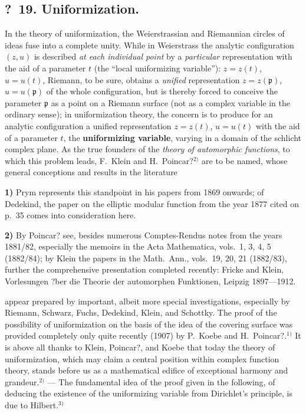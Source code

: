 \documentclass{article}
\begin{document}
\subsection*{?~19. Uniformization.}

In the theory of uniformization, the Weierstrassian and Riemannian circles of ideas fuse into a complete unity. While in Weierstrass the analytic configuration $(z, u)$ is described \emph{at each individual point} by a \emph{particular} representation with the aid of a parameter $t$ (the ``local uniformizing variable''): $z = z(t)$, $u = u(t)$, Riemann, to be sure, obtains a \emph{unified} representation $z = z(\mathfrak{p})$, $u = u(\mathfrak{p})$ of the whole configuration, but is thereby forced to conceive the parameter $\mathfrak{p}$ as a point on a Riemann surface (not as a complex variable in the ordinary sense); in uniformization theory, the concern is to produce for an analytic configuration a unified representation $z = z(t)$, $u = u(t)$ with the aid of a parameter $t$, the \textbf{uniformizing variable}, varying in a domain of the schlicht complex plane. As the true founders of the \emph{theory of automorphic functions}, to which this problem leads, F.~Klein and H.~Poincar?${}^{2)}$ are to be named, whose general conceptions and results in the literature

\textbf{1)} Prym represents this standpoint in his papers from 1869 onwards; of Dedekind, the paper on the elliptic modular function from the year 1877 cited on p.~35 comes into consideration here.

\textbf{2)} By Poincar? see, besides numerous Comptes-Rendus notes from the years 1881/82, especially the memoirs in the Acta Mathematica, vols.~1, 3, 4, 5 (1882/84); by Klein the papers in the Math.\ Ann., vols.~19, 20, 21 (1882/83), further the comprehensive presentation completed recently: Fricke and Klein, Vorlesungen ?ber die Theorie der automorphen Funktionen, Leipzig 1897---1912.

appear prepared by important, albeit more special investigations, especially by Riemann, Schwarz, Fuchs, Dedekind, Klein, and Schottky. The proof of the possibility of uniformization on the basis of the idea of the covering surface was provided completely only quite recently (1907) by P.~Koebe and H.~Poincar?.${}^{1)}$ It is above all thanks to Klein, Poincar?, and Koebe that today the theory of uniformization, which may claim a central position within complex function theory, stands before us as a mathematical edifice of exceptional harmony and grandeur.${}^{2)}$ --- The fundamental idea of the proof given in the following, of deducing the existence of the uniformizing variable from Dirichlet's principle, is due to Hilbert.${}^{3)}$
\end{document}
